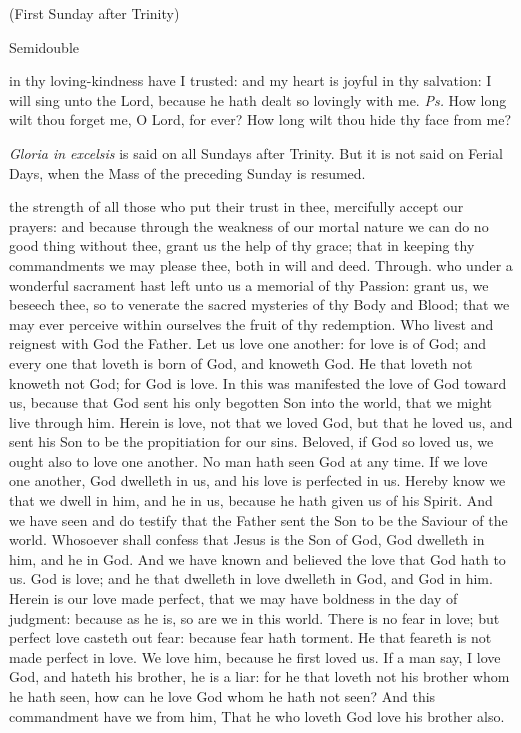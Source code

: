 \centerline{\small{(First Sunday after Trinity)}}
\begin{inhead}
    {Semidouble}
\end{inhead}

\properantiphonfix

\introit
{} in thy loving-kindness have I trusted: and my heart is joyful in thy salvation: I will sing unto the Lord, because he hath dealt so lovingly with me. \textit{Ps.} How long wilt thou forget me, O Lord, for ever? How long wilt thou hide thy face from me?
\begin{rubric}
    \emph{Gloria in excelsis} is said on all Sundays after Trinity. But it is not said on Ferial Days, when the Mass of the preceding Sunday is resumed.
\end{rubric}
\collect
{} the strength of all those who put their trust in thee, mercifully accept our prayers: and because through the weakness of our mortal nature we can do no good thing without thee, grant us the help of thy grace; that in keeping thy commandments we may please thee, both in will and deed. Through.
 who under a wonderful sacrament hast left unto us a memorial of thy Passion: grant us, we beseech thee, so to venerate the sacred mysteries of thy Body and Blood; that we may ever perceive within ourselves the fruit of thy redemption. Who livest and reignest with God the Father.
 Let us love one another: for love is of God; and every one that loveth is born of God, and knoweth God. He that loveth not knoweth not God; for God is love. In this was manifested the love of God toward us, because that God sent his only begotten Son into the world, that we might live through him. Herein is love, not that we loved God, but that he loved us, and sent his Son to be the propitiation for our sins. Beloved, if God so loved us, we ought also to love one another. No man hath seen God at any time. If we love one another, God dwelleth in us, and his love is perfected in us. Hereby know we that we dwell in him, and he in us, because he hath given us of his Spirit. And we have seen and do testify that the Father sent the Son to be the Saviour of the world. Whosoever shall confess that Jesus is the Son of God, God dwelleth in him, and he in God. And we have known and believed the love that God hath to us. God is love; and he that dwelleth in love dwelleth in God, and God in him. Herein is our love made perfect, that we may have boldness in the day of judgment: because as he is, so are we in this world. There is no fear in love; but perfect love casteth out fear: because fear hath torment. He that feareth is not made perfect in love. We love him, because he first loved us. If a man say, I love God, and hateth his brother, he is a liar: for he that loveth not his brother whom he hath seen, how can he love God whom he hath not seen? And this commandment have we from him, That he who loveth God love his brother also.

